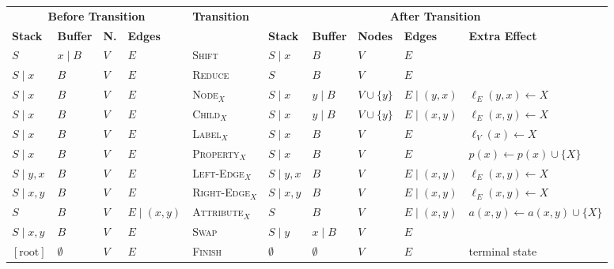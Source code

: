 \documentclass[11pt,a4paper]{article}
\begin{document}
\begin{figure*}[ht]
	\begin{adjustbox}{width=.99\textwidth,margin=1pt,frame}
	\begin{tabular}{llll|l|lllll}
		\multicolumn{4}{c|}{\textbf{\small Before Transition}} &
		\multirow{2}{*}{\textbf{\small Transition}} & 
		\multicolumn{5}{c}{\textbf{\small After Transition}} \\
		\textbf{\footnotesize Stack} & \textbf{\footnotesize Buffer} & 
		\textbf{\footnotesize N.} & \textbf{\footnotesize Edges} & & 
		\textbf{\footnotesize Stack} & \textbf{\footnotesize Buffer} & 
		\textbf{\footnotesize Nodes} & \textbf{\footnotesize Edges} & 
		\textbf{\footnotesize Extra Effect} \\ \hline
		$S$ & $x\;|\;B$ & $V$ & $E$ & \textsc{Shift} & $S\;|\;x$ & $B$ & $V$ & $E$ & \\
		$S\;|\;x$ & $B$ & $V$ & $E$ & \textsc{Reduce} & $S$ & $B$ & $V$ & $E$ & \\
		$S\;|\;x$ & $B$ & $V$ & $E$ & \textsc{Node$_X$} & $S\;|\;x$ & $y\;|\;B$ & $V\cup\{y\}$ & $E\;|\;(y,x)$ & $\ell_E(y,x)\leftarrow X$ \\
		$S\;|\;x$ & $B$ & $V$ & $E$ & \textsc{Child$_X$} & $S\;|\;x$ & $y\;|\;B$ & $V\cup\{y\}$ & $E\;|\;(x,y)$ & $\ell_E(x,y)\leftarrow X$ \\
		$S\;|\;x$ & $B$ & $V$ & $E$ & \textsc{Label$_X$} & $S\;|\;x$ & $B$ & $V$ & $E$ & $\ell_V(x)\leftarrow X$ \\
		$S\;|\;x$ & $B$ & $V$ & $E$ & \textsc{Property$_X$} & $S\;|\;x$ & $B$ & $V$ & $E$ & $p(x)\leftarrow p(x)\cup\{X\}$ \\
		$S\;|\;y,x$ & $B$ & $V$ & $E$ & \textsc{Left-Edge$_X$} & $S\;|\;y,x$ & $B$ & $V$ & $E\;|\;(x,y)$ & $\ell_E(x,y)\leftarrow X$ \\
		$S\;|\;x,y$ & $B$ & $V$ & $E$ & \textsc{Right-Edge$_X$} & $S\;|\;x,y$ & $B$ & $V$ & $E\;|\;(x,y)$ & $\ell_E(x,y)\leftarrow X$ \\
		$S$ & $B$ & $V$ & $E\;|\;(x,y)$ & \textsc{Attribute$_X$} & $S$ & $B$ & $V$ & $E\;|\;(x,y)$ & $a(x,y)\leftarrow a(x,y)\cup\{X\}$ \\
		$S\;|\;x,y$ & $B$ & $V$ & $E$ & \textsc{Swap} & $S\;|\;y$ & $x\;|\;B$ & $V$ & $E$ & \\
		$[\mathrm{root}]$ & $\emptyset$ & $V$ & $E$ & \textsc{Finish} & $\emptyset$ & $\emptyset$ & $V$ & $E$ & terminal state \\
	\end{tabular}
	\end{adjustbox}

\end{figure*}
\end{document}
